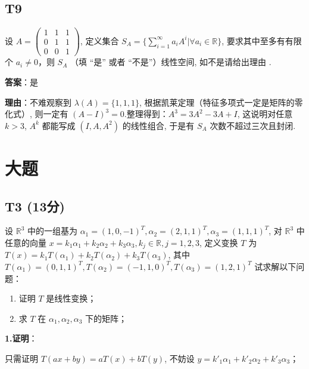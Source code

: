 \documentclass{article}
\begin{document}
\subsection{T9}

\par 设 $A=\begin{pmatrix}
	1 & 1 & 1\\
	0 & 1 & 1\\
	0 & 0 & 1
\end{pmatrix}$, 定义集合 $S_A=\{\sum_{i=1}^\infty a_iA^i|\forall a_i\in \mathbb R\}$, 要求其中至多有有限个 $a_i\neq 0$，则 $S_A$ \underline{\phantom{empty\_space}}（填 “是” 或者 “不是”）线性空间, 如不是请给出理由 \underline{\phantom{empty\_space}} .

\par \textbf{答案}：是

\par \textbf{理由}：不难观察到 $\lambda(A)=\{1, 1, 1\}$, 根据凯莱定理（特征多项式一定是矩阵的零化式）, 则一定有 $(A-I)^3=0$.整理得到：$A^3=3A^2-3A+I$, 这说明对任意 $k>3$, $A^k$ 都能写成 $(I, A, A^2)$ 的线性组合, 于是有 $S_A$ 次数不超过三次且封闭.

\section{大题}

\subsection{T3 (13分)}

\par 设 $\mathbb R^3$ 中的一组基为 $\alpha_1=(1, 0, -1)^T, \alpha_2=(2, 1, 1)^T, \alpha_3=(1, 1, 1)^T$, 对 $\mathbb R^3$ 中任意的向量 $x=k_1\alpha_1 + k_2\alpha_2+k_3\alpha_3, k_j\in\mathbb R, j=1, 2, 3$, 定义变换 $T$ 为 $T(x)=k_1T(\alpha_1)+k_2T(\alpha_2)+k_3T(\alpha_3)$, 其中 $T(\alpha_1)=(0, 1, 1)^T, T(\alpha_2)=(-1, 1, 0)^T, T(\alpha_3)=(1, 2, 1)^T$ 试求解以下问题：

\begin{enumerate}
	\item 证明 $T$ 是线性变换；
	\item 求 $T$ 在 $\alpha_1, \alpha_2, \alpha_3$ 下的矩阵；
\end{enumerate}

\par \textbf{1.证明}：

只需证明 $T(ax + by)=aT(x)+bT(y)$, 不妨设 $y=k'_1\alpha_1+k'_2\alpha_2+k'_3\alpha_3$；
\end{document}

